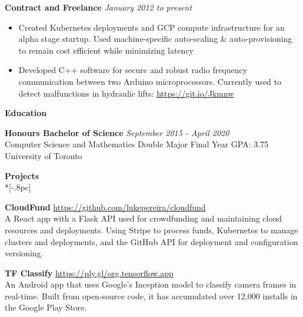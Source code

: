 \documentclass{article}
\begin{document}
{\bf Contract and Freelance} \hfill {\it January 2012 to present\/} 
\begin{itemize}[leftmargin=*]
\itemsep0em
\renewcommand\labelitemi{\tiny$\bullet$}
\item Created Kubernetes deployments and GCP compute infrastructure for an alpha stage startup. Used machine-specific auto-scaling \& auto-provisioning to remain cost efficient while minimizing latency

\item Developed C++ software for secure and robust radio frequency communication between two Arduino microprocessors. Currently used to detect malfunctions in hydraulic lifts: \url{https://git.io/Jkmnw}
\end{itemize}

\vspace{8pt}
{\large \bf Education} \\[-.8pc]
\underline{\hspace{6.1in}} 

{\bf Honours Bachelor of Science} \hfill {\it September 2015 - April 2020} \\
Computer Science and Mathematics Double Major \hfill {Final Year GPA: 3.75}\\
University of Toronto


\vspace{8pt}
{\large \bf Projects} \\*[-.8pc]
\underline{\hspace{6.1in}}

\textbf{CloudFund} \hfill \url{https://github.com/lukepereira/cloudfund}\\
A React app with a Flask API used for crowdfunding and maintaining cloud resources and deployments. Using Stripe to process funds, Kubernetes to manage clusters and deployments, and the GitHub API for deployment and configuration versioning.

\textbf{TF Classify} \hfill \url{https://ply.gl/org.tensorflow.app}\\
An Android app that uses Google’s Inception model to classify camera frames in real-time. Built from open-source code, it has accumulated over 12,000 installs in the Google Play Store.
\end{document}
